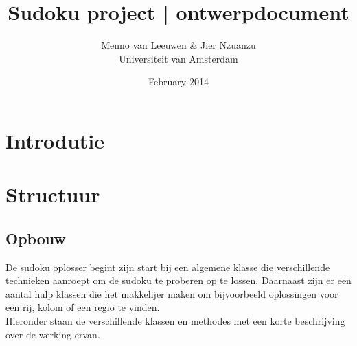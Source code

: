 \documentclass{article}
\title{Sudoku project | ontwerpdocument}
\author{Menno van Leeuwen \& Jier Nzuanzu\\ Universiteit van Amsterdam}
\date{February 2014}
\begin{document}
\maketitle
\tableofcontents
\newpage

\section{Introdutie}

\section{Structuur}
\subsection{Opbouw}
De sudoku oplosser begint zijn start bij een algemene klasse die verschillende technieken aanroept om de sudoku te proberen op te lossen. Daarnaast zijn er een aantal hulp klassen die het makkelijer maken om bijvoorbeeld oplossingen voor een rij, kolom of een regio te vinden. \\
Hieronder staan de verschillende klassen en methodes met een korte beschrijving over de werking ervan. 
\end{document}
